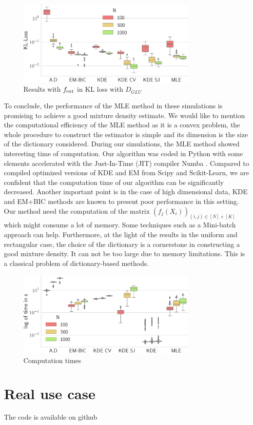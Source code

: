 \begin{figure}
\center
    \includegraphics[width=0.8\textwidth]{./TeX_files/res_lapl_gauss_not_dict_KL_GLU.png}
    \caption{Results with $f_{\textnormal{ext}}$ in KL loss with $D_{GLU}$}
    \label{fig:res_ext_KL_GLU}
\end{figure} 
To conclude, the performance of the MLE method in these simulations is promising to achieve a good mixture density estimate. We would like to mention the computational efficiency of the MLE method as it is a convex problem, the whole procedure to construct the estimator is simple and its dimension is the size of the dictionary considered. During our simulations, the MLE method showed interesting time of computation. Our algorithm was coded in Python with some elements accelerated with the Just-In-Time (JIT) compiler Numba \citep{numba}. Compared to compiled optimized versions of KDE and EM from Scipy and Scikit-Learn\citep{scikit-learn}, we are confident that the computation time of our algorithm can be significantly decreased. Another important point is in the case of high dimensional data, KDE and EM+BIC methods are known to present poor performance in this setting. Our method need the computation of the matrix $(f_j(X_i))_{(i,j)\in [N]\times [K]}$ which might consume a lot of memory. Some techniques such as a Mini-batch approach can help. Furthermore, at the light of the results in the uniform and rectangular case, the choice of the dictionary is a cornerstone in constructing a good mixture density. It can not be too large due to memory limitations. This is a classical problem of dictionary-based methods.

\begin{figure}
\center
    \includegraphics[width=0.8\textwidth]{./TeX_files/res_times.png}
    \caption{Computation times}
    \label{fig:res_times}
\end{figure}

\section{Real use case}

The code is available on github